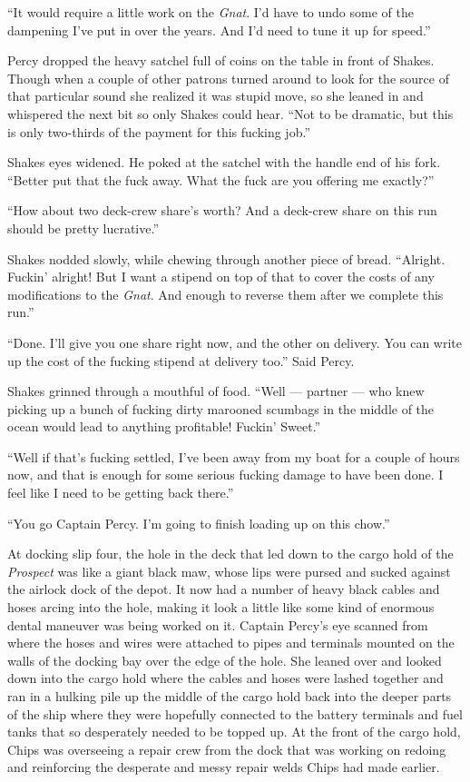 \documentclass[
]{scrbook}
\begin{document}
``It would require a little work on the \emph{Gnat}. I'd have to undo
some of the dampening I've put in over the years. And I'd need to tune
it up for speed.''

Percy dropped the heavy satchel full of coins on the table in front of
Shakes. Though when a couple of other patrons turned around to look for
the source of that particular sound she realized it was stupid move, so
she leaned in and whispered the next bit so only Shakes could hear.
``Not to be dramatic, but this is only two-thirds of the payment for
this fucking job.''

Shakes eyes widened. He poked at the satchel with the handle end of his
fork. ``Better put that the fuck away. What the fuck are you offering me
exactly?''

``How about two deck-crew share's worth? And a deck-crew share on this
run should be pretty lucrative.''

Shakes nodded slowly, while chewing through another piece of bread.
``Alright. Fuckin' alright! But I want a stipend on top of that to cover
the costs of any modifications to the \emph{Gnat}. And enough to reverse
them after we complete this run.''

``Done. I'll give you one share right now, and the other on delivery.
You can write up the cost of the fucking stipend at delivery too.'' Said
Percy.

Shakes grinned through a mouthful of food. ``Well --- partner --- who
knew picking up a bunch of fucking dirty marooned scumbags in the middle
of the ocean would lead to anything profitable! Fuckin' Sweet.''

``Well if that's fucking settled, I've been away from my boat for a
couple of hours now, and that is enough for some serious fucking damage
to have been done. I feel like I need to be getting back there.''

``You go Captain Percy. I'm going to finish loading up on this chow.''

At docking slip four, the hole in the deck that led down to the cargo
hold of the \emph{Prospect} was like a giant black maw, whose lips were
pursed and sucked against the airlock dock of the depot. It now had a
number of heavy black cables and hoses arcing into the hole, making it
look a little like some kind of enormous dental maneuver was being
worked on it. Captain Percy's eye scanned from where the hoses and wires
were attached to pipes and terminals mounted on the walls of the docking
bay over the edge of the hole. She leaned over and looked down into the
cargo hold where the cables and hoses were lashed together and ran in a
hulking pile up the middle of the cargo hold back into the deeper parts
of the ship where they were hopefully connected to the battery terminals
and fuel tanks that so desperately needed to be topped up. At the front
of the cargo hold, Chips was overseeing a repair crew from the dock that
was working on redoing and reinforcing the desperate and messy repair
welds Chips had made earlier.
\end{document}
